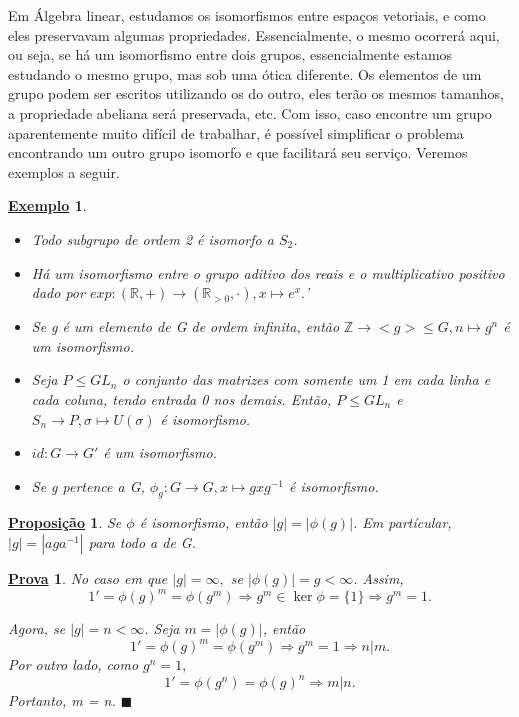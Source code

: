 \documentclass{article}
\newtheorem*{prop*}{\underline{Proposi\c c\~ao}}
\newtheorem{example*}{\underline{Exemplo}}
\newtheorem*{proof*}{\underline{Prova}}
\renewcommand\qedsymbol{$\blacksquare$}
\begin{document}
  Em \'Algebra linear, estudamos os isomorfismos entre espa\c cos vetoriais, e como eles preservavam algumas propriedades. Essencialmente,
o mesmo ocorrer\'a aqui, ou seja, se h\'a um isomorfismo entre dois grupos, essencialmente estamos estudando o mesmo grupo, mas sob uma \'otica diferente.
Os elementos de um grupo podem ser escritos utilizando os do outro, eles ter\~ao os mesmos tamanhos, a propriedade abeliana ser\'a preservada, etc.
Com isso, caso encontre um grupo aparentemente muito dif\'icil de trabalhar, \'e poss\'ivel simplificar o problema encontrando um outro grupo
isomorfo e que facilitar\'a seu servi\c co. Veremos exemplos a seguir.
 \begin{example*}
  \begin{itemize}
    \item[1)] Todo subgrupo de ordem 2 \'e isomorfo a $S_{2}$.
    \item[2)] H\'a um isomorfismo entre o grupo aditivo dos reais e o multiplicativo positivo dado por $exp:(\mathbb{R}, +)\rightarrow (\mathbb{R}_{>0}, \cdot), x\mapsto e^{x}.$'
    \item[3)] Se g \'e um elemento de G de ordem infinita, ent\~ao $\mathbb{Z}\rightarrow <g>\leq{G}, n\mapsto g^{n}$ \'e um isomorfismo.
    \item[4)] Seja $P\leq{GL_{n}}$ o conjunto das matrizes com somente um 1 em cada linha e cada coluna, tendo entrada 0 nos demais. Ent\~ao,
  $P\leq{GL_{n}}$ e $S_{n}\rightarrow P, \sigma\mapsto U(\sigma)$ \'e isomorfismo.
    \item[5)] $id:G\rightarrow G'$ \'e um isomorfismo.
    \item[6)] Se g pertence a G, $\phi_{g}:G\rightarrow G, x\mapsto gxg^{-1}$ \'e isomorfismo.
  \end{itemize}
 \end{example*}
 \begin{prop*}
   Se $\phi$ \'e isomorfismo, ent\~ao $|g| = |\phi(g)|$. Em part\'icular, $|g| = |aga^{-1}|$ para todo a de G.
 \end{prop*}
\begin{proof*}
    No caso em que $|g| = \infty,$ se $|\phi(g)| = g < \infty$. Assim, 
      $$
      1' = \phi(g)^{m} = \phi(g^{m}) \Rightarrow g^{m}\in\ker{\phi} = \{1\} \Rightarrow g^{m} = 1.
      $$

    Agora, se $|g| = n <\infty$. Seja $m = |\phi(g)|$, ent\~ao 
      $$
        1' = \phi(g)^{m} = \phi(g^{m}) \Rightarrow g^{m} = 1 \Rightarrow n|m.
      $$ 
    Por outro lado, como $g^{n} = 1,$ 
      $$
        1' = \phi(g^{n}) = \phi(g)^{n} \Rightarrow m|n.
      $$
    Portanto, m = n. \qedsymbol
\end{proof*}
\end{document}
